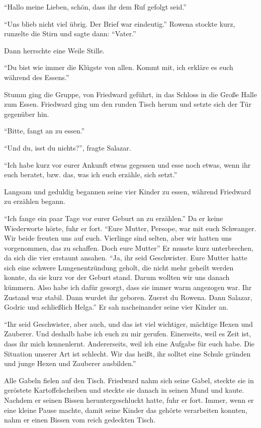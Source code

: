 \enquote{Hallo meine Lieben, schön, dass ihr dem Ruf gefolgt seid.}

\enquote{Uns blieb nicht viel übrig. Der Brief war eindeutig.} Rowena stockte kurz, runzelte die Stirn und sagte dann: \enquote{Vater.}

Dann herrschte eine Weile Stille.

\enquote{Du bist wie immer die Klügste von allen. Kommt mit, ich erkläre es euch während des Essens.}

Stumm ging die Gruppe, von Friedward geführt, in das Schloss in die Große Halle zum Essen. Friedward ging um den runden Tisch herum und setzte sich der Tür gegenüber hin.

\enquote{Bitte, fangt an zu essen.}

\enquote{Und du, isst du nichts?}, fragte Salazar.

\enquote{Ich habe kurz vor eurer Ankunft etwas gegessen und esse noch etwas, wenn ihr euch beratet, bzw. das, was ich euch erzähle, sich setzt.}

Langsam und geduldig begannen seine vier Kinder zu essen, während Friedward zu erzählen begann.

\enquote{Ich fange ein paar Tage vor eurer Geburt an zu erzählen.} Da er keine Wiederworte hörte, fuhr er fort. \enquote{Eure Mutter, Persope, war mit euch Schwanger. Wir beide freuten uns auf euch. Vierlinge sind selten, aber wir hatten uns vorgenommen, das zu schaffen. Doch eure Mutter\abs} Er musste kurz unterbrechen, da sich die vier erstaunt ansahen. \enquote{Ja, ihr seid Geschwister. \gst Eure Mutter hatte sich eine schwere Lungenentzündung geholt, die nicht mehr geheilt werden konnte, da sie kurz vor der Geburt stand. Darum wollten wir uns danach kümmern. Also habe ich dafür gesorgt, dass sie immer warm angezogen war. Ihr Zustand war stabil. Dann wurdet ihr geboren. Zuerst du Rowena. Dann Salazar, Godric und schließlich Helga.} Er sah nacheinander seine vier Kinder an.

\enquote{Ihr seid Geschwister, aber auch, und das ist viel wichtiger, mächtige Hexen und Zauberer. Und deshalb habe ich euch zu mir gerufen. Einerseits, weil es Zeit ist, dass ihr mich kennenlernt. Andererseits, weil ich eine Aufgabe für euch habe. Die Situation unserer Art ist schlecht. Wir \gst das heißt, ihr \gst solltet eine Schule gründen und junge Hexen und Zauberer ausbilden.}

Alle Gabeln fielen auf den Tisch. Friedward nahm sich seine Gabel, steckte sie in geröstete Kartoffelscheiben und steckte sie danach in seinen Mund und kaute. Nachdem er seinen Bissen heruntergeschluckt hatte, fuhr er fort. Immer, wenn er eine kleine Pause machte, damit seine Kinder das gehörte verarbeiten konnten, nahm er einen Bissen vom reich gedeckten Tisch.


